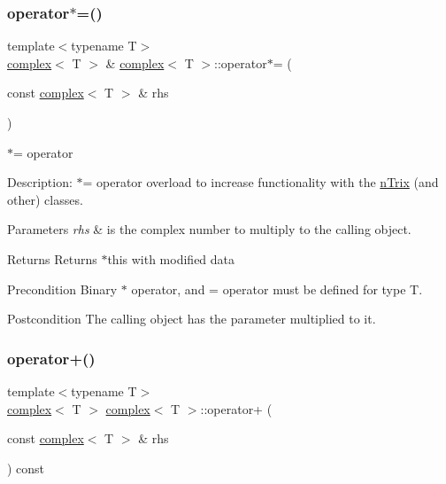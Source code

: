 \subsubsection{\texorpdfstring{operator$\ast$=()}{operator*=()}}
{\footnotesize\ttfamily template$<$typename T$>$ \\
\hyperlink{classcomplex}{complex}$<$ T $>$ \& \hyperlink{classcomplex}{complex}$<$ T $>$\+::operator$\ast$= (\begin{DoxyParamCaption}\item[{const \hyperlink{classcomplex}{complex}$<$ T $>$ \&}]{rhs }\end{DoxyParamCaption})}



$\ast$= operator 

Description\+: $\ast$= operator overload to increase functionality with the \hyperlink{classnTrix}{n\+Trix} (and other) classes. 
\begin{DoxyParams}{Parameters}
{\em rhs} & is the complex number to multiply to the calling object. \\
\hline
\end{DoxyParams}
\begin{DoxyReturn}{Returns}
Returns $\ast$this with modified data 
\end{DoxyReturn}
\begin{DoxyPrecond}{Precondition}
Binary $\ast$ operator, and = operator must be defined for type T. 
\end{DoxyPrecond}
\begin{DoxyPostcond}{Postcondition}
The calling object has the parameter multiplied to it. 
\end{DoxyPostcond}
\mbox{\label{classcomplex_aa10f3dbe0731c90d1b15408e3f11ae52}} 
\subsubsection{\texorpdfstring{operator+()}{operator+()}}
{\footnotesize\ttfamily template$<$typename T$>$ \\
\hyperlink{classcomplex}{complex}$<$ T $>$ \hyperlink{classcomplex}{complex}$<$ T $>$\+::operator+ (\begin{DoxyParamCaption}\item[{const \hyperlink{classcomplex}{complex}$<$ T $>$ \&}]{rhs }\end{DoxyParamCaption}) const}



